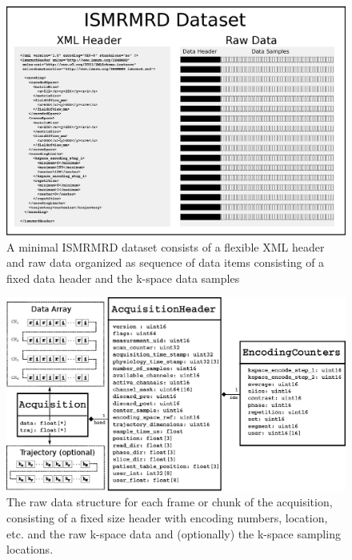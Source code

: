 \documentclass[12pt]{article}
\begin{document}
\begin{figure}
\begin{center}
\includegraphics[width=6in]{figure1_ismrmrd_format.eps}
\caption{A minimal ISMRMRD dataset consists of a flexible XML header and raw data organized as sequence of data items consisting of a fixed data header and the k-space data samples}
\label{fig:format}
\end{center}
\end{figure}

\begin{figure}
\begin{center}
\includegraphics[width=6in]{figure2_uml_diagram.eps}
\caption{The raw data structure for each frame or chunk of the acquisition, consisting of a fixed size header with encoding numbers, location, etc. and the raw k-space data and (optionally) the k-space sampling locations.}
\label{fig:cstruct}
\end{center}
\end{figure}
\end{document}
